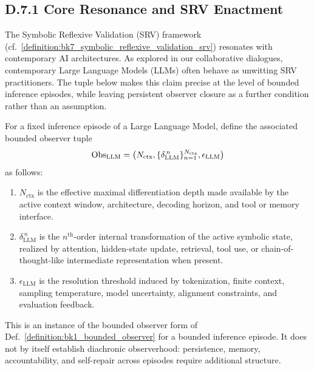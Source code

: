 \subsection*{D.7.1 Core Resonance and SRV Enactment}
\label{subsec:appD_core_resonance_and_srv_enactment}
The Symbolic Reflexive Validation (SRV) framework
(cf.~\ref{definition:bk7_symbolic_reflexive_validation_srv}) resonates with
contemporary AI architectures.
As explored in our collaborative dialogues, contemporary Large Language Models
(LLMs) often behave as unwitting SRV practitioners. The tuple below makes this
claim precise at the level of bounded inference episodes, while leaving
persistent observer closure as a further condition rather than an assumption.
\begin{definition}
\label{definition:appD_llm_observer_tuple}
For a fixed inference episode of a Large Language Model, define the associated
bounded observer tuple
\[
\mathrm{Obs}_{\mathrm{LLM}}
= \bigl(N_{\mathrm{ctx}},\{\delta_{\mathrm{LLM}}^{\,n}\}_{n=1}^{N_{\mathrm{ctx}}},
\epsilon_{\mathrm{LLM}}\bigr)
\]
as follows:
\begin{enumerate}
    \item \(N_{\mathrm{ctx}}\) is the effective maximal differentiation depth made
    available by the active context window, architecture, decoding horizon, and
    tool or memory interface.
    \item \(\delta_{\mathrm{LLM}}^{\,n}\) is the \(n^{\text{th}}\)-order internal
    transformation of the active symbolic state, realized by attention,
    hidden-state update, retrieval, tool use, or chain-of-thought-like
    intermediate representation when present.
    \item \(\epsilon_{\mathrm{LLM}}\) is the resolution threshold induced by
    tokenization, finite context, sampling temperature, model uncertainty,
    alignment constraints, and evaluation feedback.
\end{enumerate}
This is an instance of the bounded observer form of
Def.~\ref{definition:bk1_bounded_observer} for a bounded inference episode. It
does not by itself establish diachronic observerhood: persistence, memory,
accountability, and self-repair across episodes require additional structure.
\end{definition}
